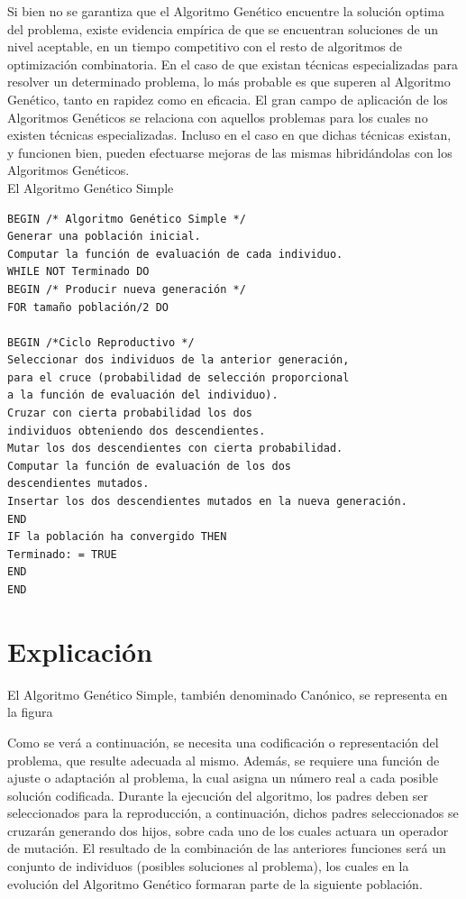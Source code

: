 \documentclass[11pt]{article}
\begin{document}
Si bien no se garantiza que el Algoritmo Genético encuentre la solución optima del problema, existe evidencia empírica de que se encuentran soluciones de un nivel aceptable, en un tiempo competitivo con el resto de algoritmos de optimización combinatoria. En el caso de que existan técnicas especializadas para resolver un determinado problema, lo más probable es que superen al Algoritmo Genético, tanto en rapidez como en eficacia. El gran campo de aplicación de los Algoritmos Genéticos se relaciona con aquellos problemas para los cuales no existen técnicas especializadas. Incluso en el caso en que dichas técnicas existan, y funcionen bien, pueden efectuarse mejoras de las mismas hibridándolas con los Algoritmos Genéticos.\\

El Algoritmo Genético Simple

 \begin{verbatim}
BEGIN /* Algoritmo Genético Simple */
Generar una población inicial.
Computar la función de evaluación de cada individuo.
WHILE NOT Terminado DO
BEGIN /* Producir nueva generación */
FOR tamaño población/2 DO

BEGIN /*Ciclo Reproductivo */
Seleccionar dos individuos de la anterior generación,
para el cruce (probabilidad de selección proporcional
a la función de evaluación del individuo).
Cruzar con cierta probabilidad los dos
individuos obteniendo dos descendientes.
Mutar los dos descendientes con cierta probabilidad.
Computar la función de evaluación de los dos
descendientes mutados.
Insertar los dos descendientes mutados en la nueva generación.
END
IF la población ha convergido THEN
Terminado: = TRUE
END
END
\end{verbatim}

\newpage
\section {Explicación}

El Algoritmo Genético Simple, también denominado Canónico, se representa en la figura

Como se verá a continuación, se necesita una codificación o representación del problema, que resulte adecuada al mismo. Además, se requiere una función de ajuste o adaptación al problema, la cual asigna un número real a cada posible solución codificada. Durante la ejecución del algoritmo, los padres deben ser seleccionados para la reproducción, a continuación, dichos padres seleccionados se cruzarán generando dos hijos, sobre cada uno de los cuales actuara un operador de mutación. El resultado de la combinación de las anteriores funciones será un conjunto de individuos (posibles soluciones al problema), los cuales en la evolución del Algoritmo Genético formaran parte de la siguiente población.
\end{document}
